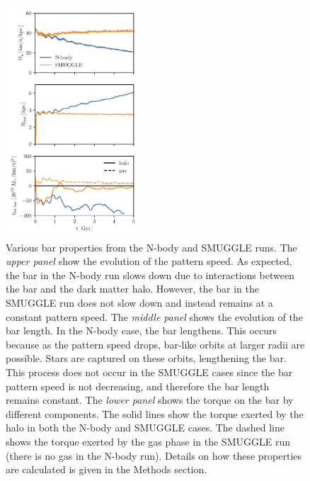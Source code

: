 \documentclass{natureprintstyle}
\begin{document}
\begin{figure}[h]%
\centering
\includegraphics[width=0.45\textwidth]{fig/fig2.pdf}
\caption{Various bar properties from the N-body and SMUGGLE runs. The
\textit{upper panel} show the evolution of the pattern speed. As expected, the
bar in the N-body run slows down due to interactions between the bar and the
dark matter halo. However, the bar in the SMUGGLE run does not slow down and
instead remains at a constant pattern speed. The \textit{middle panel} shows
the evolution of the bar length. In the N-body case, the bar lengthens. This
occurs because as the pattern speed drops, bar-like orbits at larger radii are
possible. Stars are captured on these orbits, lengthening the bar. This
process does not occur in the SMUGGLE cases since the bar pattern speed is not
decreasing, and therefore the bar length remains constant. The \textit{lower
panel} shows the torque on the bar by different components. The solid lines
show the torque exerted by the halo in both the N-body and SMUGGLE cases. The
dashed line shows the torque exerted by the gas phase in the SMUGGLE run
(there is no gas in the N-body run). Details on how these properties
are calculated is given in the Methods section.}\label{fig:prop}
\end{figure}
\end{document}
